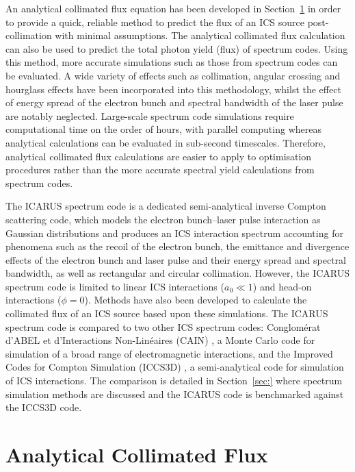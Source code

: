 \documentclass[../main.tex]{subfiles}
\begin{document}
An analytical collimated flux equation has been developed in Section~\ref{sec:analytical_collimated_flux} in order to provide a quick, reliable method to predict the flux of an ICS source post-collimation with minimal assumptions. The analytical collimated flux calculation can also be used to predict the total photon yield (flux) of spectrum codes. Using this method, more accurate simulations such as those from spectrum codes can be evaluated. A wide variety of effects such as collimation, angular crossing and hourglass effects have been incorporated into this methodology, whilst the effect of energy spread of the electron bunch and spectral bandwidth of the laser pulse are notably neglected. Large-scale spectrum code simulations require computational time on the order of hours, with parallel computing whereas analytical calculations can be evaluated in sub-second timescales. Therefore, analytical collimated flux calculations are easier to apply to optimisation procedures rather than the more accurate spectral yield calculations from spectrum codes.   

The \textsc{ICARUS} spectrum code is a dedicated semi-analytical inverse Compton scattering code, which models the electron bunch--laser pulse interaction as Gaussian distributions and produces an ICS interaction spectrum
accounting for phenomena such as the recoil of the electron bunch, the emittance and divergence effects of the electron bunch and laser pulse and their energy spread and spectral bandwidth, as well as rectangular and circular collimation. However, the \textsc{ICARUS} spectrum code is limited to linear ICS interactions ($a_{0} \ll 1$) and head-on interactions ($\phi=0$). Methods have also been developed to calculate the collimated flux of an ICS source based upon these simulations. The \textsc{ICARUS} spectrum code is compared to two other ICS spectrum codes: Conglom\'{e}rat d'ABEL et d'Interactions Non-Lin\'{e}aires (\textsc{CAIN}) \cite{chen1995cain}, a Monte Carlo code for simulation of a broad range of electromagnetic interactions, and the Improved Codes for Compton Simulation (\textsc{ICCS3D}) \cite{krafft2016laser,ranjan2018simulation}, a semi-analytical code for simulation of ICS interactions. The comparison is detailed in Section~\ref{sec:} where spectrum simulation methods are discussed and the \textsc{ICARUS} code is benchmarked against the \textsc{ICCS3D} code.

\section{Analytical Collimated Flux}
\label{sec:analytical_collimated_flux}
\end{document}

